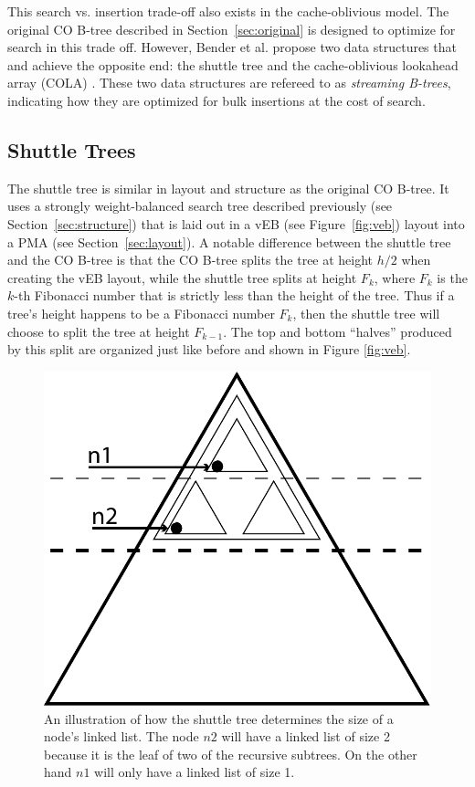 \documentclass[preprint]{style}
\begin{document}
This search vs. insertion trade-off also exists in the cache-oblivious model.
The original CO B-tree described in Section~\ref{sec:original} is designed to
optimize for search in this trade off. However, Bender et al. propose two data
structures that and achieve the opposite end: the shuttle tree and the
cache-oblivious lookahead array (COLA) \cite{BenderFaFi07}. These two data
structures are refereed to as \textit{streaming B-trees}, indicating how they
are optimized for bulk insertions at the cost of search.

\subsection{Shuttle Trees}

The shuttle tree is similar in layout and structure as the original CO B-tree.
It uses a strongly weight-balanced search tree described previously (see
Section~\ref{sec:structure}) that is laid out in a vEB (see
Figure~\ref{fig:veb}) layout into a PMA (see Section~\ref{sec:layout}). A
notable difference between the shuttle tree and the CO B-tree is that the CO
B-tree splits the tree at height $h/2$ when creating the vEB layout, while the
shuttle tree splits at height $F_k$, where $F_k$ is the $k$-th Fibonacci number
that is strictly less than the height of the tree. Thus if a tree's height
happens to be a Fibonacci number $F_k$, then the shuttle tree will choose to
split the tree at height $F_{k-1}$. The top and bottom ``halves'' produced by
this split are organized just like before and shown in Figure \ref{fig:veb}.

\begin{figure}

\begin{center}
	\includegraphics[width=0.8\columnwidth]{figures/buffers.pdf}
\end{center}

\caption{An illustration of how the shuttle tree determines the size of a node's linked list. The 
node $n2$ will have a linked list of size 2 because it is the leaf of two of the recursive subtrees. 
On the other hand $n1$ will only have a linked list of size 1.}
\label{fig:buffers}
\end{figure}
\end{document}
